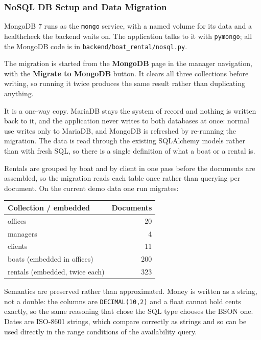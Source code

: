 \documentclass[a4paper, 11pt]{article}          %
\begin{document}
\subsubsection{NoSQL DB Setup and Data Migration}

MongoDB 7 runs as the \texttt{mongo} service, with a named volume for its data
and a healthcheck the backend waits on. The application talks to it with
\texttt{pymongo}; all the MongoDB code is in
\texttt{backend/boat\_rental/nosql.py}.

The migration is started from the \textbf{MongoDB} page in the manager
navigation, with the \textbf{Migrate to MongoDB} button. It clears all three
collections before writing, so running it twice produces the same result rather
than duplicating anything.

It is a one-way copy. MariaDB stays the system of record and nothing is written
back to it, and the application never writes to both databases at once: normal
use writes only to MariaDB, and MongoDB is refreshed by re-running the
migration. The data is read through the existing SQLAlchemy models rather than
with fresh SQL, so there is a single definition of what a boat or a rental is.

Rentals are grouped by boat and by client in one pass before the documents are
assembled, so the migration reads each table once rather than querying per
document. On the current demo data one run migrates:

\begin{center}
\begin{tabular}{lr}
\toprule
Collection / embedded & Documents \\
\midrule
offices    & 20 \\
managers   & 4 \\
clients    & 11 \\
boats (embedded in offices)      & 200 \\
rentals (embedded, twice each)   & 323 \\
\bottomrule
\end{tabular}
\end{center}

Semantics are preserved rather than approximated. Money is written as a string,
not a double: the columns are \texttt{DECIMAL(10,2)} and a float cannot hold
cents exactly, so the same reasoning that chose the SQL type chooses the BSON
one. Dates are ISO-8601 strings, which compare correctly as strings and so can
be used directly in the range conditions of the availability query.
\end{document}
